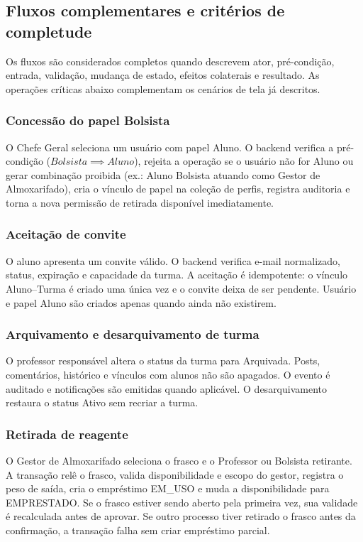 \documentclass[12pt,a4paper]{article}
\begin{document}
\subsection{Fluxos complementares e critérios de completude}
Os fluxos são considerados completos quando descrevem ator, pré-condição, entrada, validação, mudança de estado, efeitos colaterais e resultado. As operações críticas abaixo complementam os cenários de tela já descritos.

\subsubsection{Concessão do papel Bolsista}
O Chefe Geral seleciona um usuário com papel Aluno. O backend verifica a pré-condição ($Bolsista \implies Aluno$), rejeita a operação se o usuário não for Aluno ou gerar combinação proibida (ex.: Aluno Bolsista atuando como Gestor de Almoxarifado), cria o vínculo de papel na coleção de perfis, registra auditoria e torna a nova permissão de retirada disponível imediatamente.

\subsubsection{Aceitação de convite}
O aluno apresenta um convite válido. O backend verifica e-mail normalizado, status, expiração e capacidade da turma. A aceitação é idempotente: o vínculo Aluno--Turma é criado uma única vez e o convite deixa de ser pendente. Usuário e papel Aluno são criados apenas quando ainda não existirem.

\subsubsection{Arquivamento e desarquivamento de turma}
O professor responsável altera o status da turma para Arquivada. Posts, comentários, histórico e vínculos com alunos não são apagados. O evento é auditado e notificações são emitidas quando aplicável. O desarquivamento restaura o status Ativo sem recriar a turma.

\subsubsection{Retirada de reagente}
O Gestor de Almoxarifado seleciona o frasco e o Professor ou Bolsista retirante. A transação relê o frasco, valida disponibilidade e escopo do gestor, registra o peso de saída, cria o empréstimo EM\_USO e muda a disponibilidade para EMPRESTADO. Se o frasco estiver sendo aberto pela primeira vez, sua validade é recalculada antes de aprovar. Se outro processo tiver retirado o frasco antes da confirmação, a transação falha sem criar empréstimo parcial.
\end{document}

